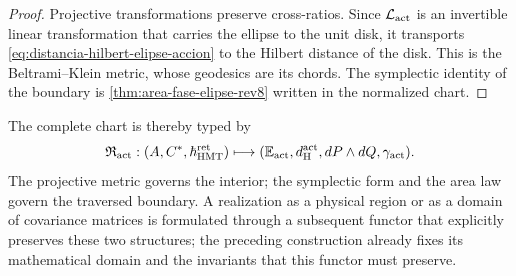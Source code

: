\begin{proof}
Projective transformations preserve cross-ratios. Since
\(\mathcal L_{\rm act}\) is an invertible linear transformation that carries
the ellipse to the unit disk, it transports
\eqref{eq:distancia-hilbert-elipse-accion} to the Hilbert distance of the
disk. This is the Beltrami--Klein metric, whose geodesics are its chords.
The symplectic identity of the boundary is
\cref{thm:area-fase-elipse-rev8} written in the normalized chart.
\end{proof}

The complete chart is thereby typed by
\[
 \mathfrak R_{\rm act}:
 (A,C^*,\hbar_{\rm HMT}^{\rm ret})
 \longmapsto
 (\mathbb E_{\rm act},d_{\rm H}^{\rm act},
  dP\wedge dQ,\gamma_{\rm act}).
\]
The projective metric governs the interior; the symplectic form and the area
law govern the traversed boundary. A realization as a physical region or
as a domain of covariance matrices is formulated through a subsequent functor
that explicitly preserves these two structures; the preceding construction
already fixes its mathematical domain and the invariants that this functor must preserve.
